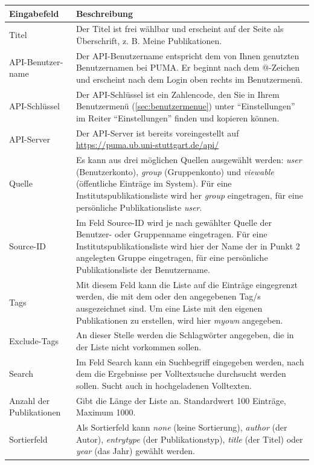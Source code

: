 \begin{longtabu}{|X|p{7cm}|}\hline
\bfseries Eingabefeld &\bfseries Beschreibung\\ \hline
Titel& 	Der Titel ist frei wählbar und erscheint auf der Seite als Überschrift, z. B. Meine Publikationen. \\ \hline
API-Benutzer­­name &	Der API-Benutzername entspricht dem von Ihnen genutzten Benutzernamen bei PUMA. Er beginnt nach dem @-Zeichen und erscheint nach dem Login oben rechts im Benutzermenü.\\ \hline
API-Schlüssel &	Der API-Schlüs­sel ist ein Zahlencode, den Sie in Ihrem Benutzermenü (\autoref{sec:benutzermenue}) unter \enquote{Einstellungen} im Reiter \enquote{Einstellungen} finden und kopieren können.\\ \hline
API-Server &	Der API-Server ist bereits voreingestellt auf \url{https://puma.ub.uni-stuttgart.de/api/}\\ \hline
Quelle & Es kann aus drei möglichen Quellen ausgewählt werden: \textit{user} (Benutzerkonto), \textit{group} (Gruppenkonto) und \textit{viewable} (öffentliche Einträge im System). Für eine Institutspublikationsliste wird her \textit{group} eingetragen, für eine persönliche Publikationsliste \textit{user}.\\ \hline
Source-ID &	Im Feld Source-ID wird je nach gewählter Quelle der Benutzer- oder Gruppenname eingetragen. Für eine Institutspublikationsliste wird hier der Name der in Punkt 2 angelegten Gruppe eingetragen, für eine persönliche Publikationsliste der Benutzername. 
\\ \hline
Tags &	Mit diesem Feld kann die Liste auf die Einträge eingegrenzt werden, die mit dem oder den angegebenen Tag/s ausgezeichnet sind. Um eine Liste mit den eigenen Publikationen zu erstellen, wird hier \textit{myown} angegeben.\\ \hline
Exclude-Tags& An dieser Stelle werden die Schlagwörter angegeben, die in der Liste nicht vorkommen sollen.\\ \hline
Search &	Im Feld Search kann ein Suchbegriff eingegeben werden, nach dem die Ergebnisse per Volltextsuche durchsucht werden sollen. Sucht auch in hochgeladenen Volltexten.\\ \hline
Anzahl der Publikationen &	Gibt die Länge der Liste an. Standardwert 100 Einträge, Maximum 1000. \\ \hline
Sortierfeld &	Als Sortierfeld kann \textit{none} (keine Sortierung), \textit{author} (der Autor), \textit{entrytype} (der Publikationstyp), \textit{title} (der Titel) oder \textit{year} (das Jahr) gewählt werden.\\ \hline

\end{longtabu}
